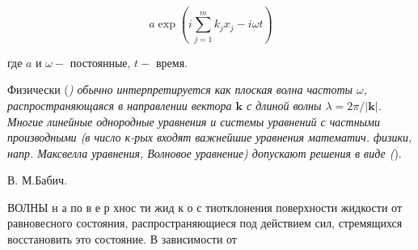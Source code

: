 \documentclass[10pt]{article}
\begin{document}
\[

a \exp \left(i \sum_{j=1}^{m} k_{j} x_{j}-i \omega t\right)

\]



где $a$ и $\omega-$ постоянные, $t-$ время.



Физически (\textit{) обычно интерпретируется как плоская волна частоты $\omega$, распространяющаяся в направлении вектора $\boldsymbol{k}$ с длиной волны $\lambda=2 \pi /|\boldsymbol{k}|$. Многие линейные однородные уравнения и системы уравнений с частными производными (в число к-рых входят важнейшие уравнения математич. физики, напр. Максвелла уравнения, Волновое уравнение) допускают решения в виде (}).



В. М.Бабич.



ВОЛНЫ н а по в е р хнос ти жид к о с тиотклонения поверхности жидкости от равновесного состояния, распространяющиеся под действием сил, стремящихся восстановить это состояние. В зависимости от
\end{document}
